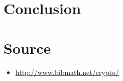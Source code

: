 \documentclass[a4paper,12pt]{article}
\begin{document}
\part{Conclusion}

\newpage

\part*{Source}

\begin{itemize}
\item \href{http://www.bibmath.net/crypto/}{http://www.bibmath.net/crypto/}
\end{itemize}
\end{document}

